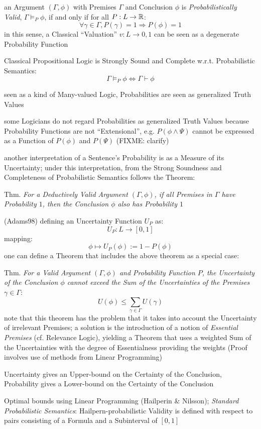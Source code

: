 an Argument $(\Gamma,\phi)$ with Premises $\Gamma$ and Conclusion $\phi$ is
\emph{Probabilistically Valid}, $\Gamma\vDash_P\phi$, if and only if for all
$P : L \rightarrow \mathbb{R}$:
\[
  \forall \gamma \in \Gamma, P(\gamma) = 1 \Rightarrow P(\phi) = 1
\]
in this sense, a Classical ``Valuation'' $v : L \rightarrow {0,1}$ can be seen
as a degenerate Probability Function

Classical Propositional Logic is Strongly Sound and Complete w.r.t.
Probabilistic Semantics:
\[
  \Gamma \vDash_P \phi \Leftrightarrow \Gamma \vdash \phi
\]

seen as a kind of Many-valued Logic, Probabilities are seen as generalized Truth
Values

some Logicians do not regard Probabilities as generalized Truth Values because
Probability Functions are not ``Extensional'', e.g. $P(\phi \wedge \Psi)$ cannot
be expressed as a Function of $P(\phi)$ and $P(\Psi)$ (FIXME: clarify)

another interpretation of a Sentence's Probability is as a Measure of its
Uncertainty; under this interpretation, from the Strong Soundness and
Completeness of Probabilistic Semantics follows the Theorem:

Thm. \emph{For a Deductively Valid Argument $(\Gamma,\phi)$, if all Premises in
  $\Gamma$ have Probability $1$, then the Conclusion $\phi$ also has Probability
  $1$}

(Adams98) defining an Uncertainty Function $U_P$ as:
\[
  U_P : L \rightarrow [0,1]
\]
mapping:
\[
  \phi \mapsto U_P(\phi) := 1 - P(\phi)
\]
one can define a Theorem that includes the above theorem as a special case:

Thm. \emph{For a Valid Argument $(\Gamma,\phi)$ and Probability Function $P$,
  the Uncertainty of the Conclusion $\phi$ cannot exceed the Sum of the
  Uncertainties of the Premises $\gamma \in \Gamma$}:
\[
  U(\phi) \leq \sum_{\gamma\in\Gamma} U(\gamma)
\]
note that this theorem has the problem that it takes into account the
Uncertainty of irrelevant Premises; a solution is the introduction of a notion
of \emph{Essential Premises} (cf. Relevance Logic), yielding a Theorem that uses
a weighted Sum of the Uncertainties with the degree of Essentialness providing
the weights (Proof involves use of methods from Linear Programming)

Uncertainty gives an Upper-bound on the Certainty of the Conclusion, Probability
gives a Lower-bound on the Certainty of the Conclusion

Optimal bounds using Linear Programming (Hailperin \& Nilsson);
\emph{Standard Probabilistic Semantics}: Hailpern-probabilistic Validity is
defined with respect to pairs consisting of a Formula and a Subinterval of
$[0,1]$

